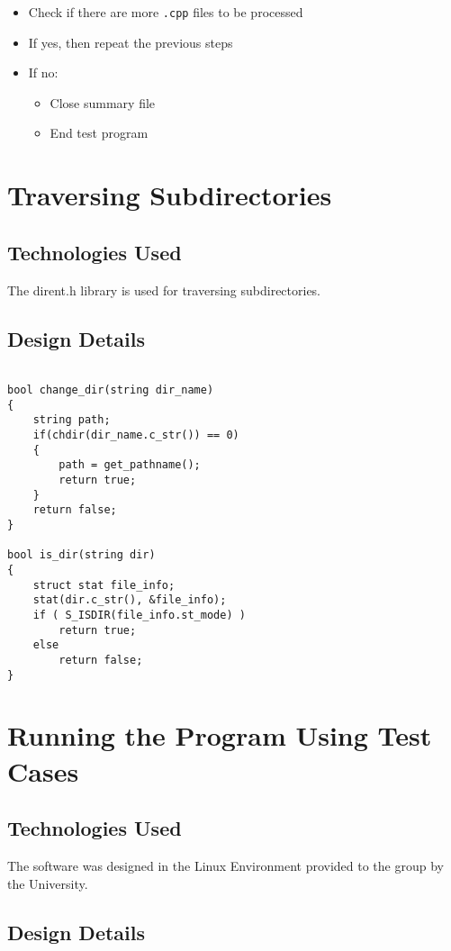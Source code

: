 \begin{itemize}
\item Check if there are more {\tt .cpp} files to be processed
  \item If yes, then repeat the previous steps
  \item If no:
	\begin{itemize}
 		\item Close summary file
 		\item End test program
	\end{itemize}
\end{itemize}


\section{Traversing Subdirectories }

\subsection{Technologies  Used}
The dirent.h library is used for traversing subdirectories.

\subsection{Design Details}

\begin{lstlisting}

bool change_dir(string dir_name)
{
    string path;
    if(chdir(dir_name.c_str()) == 0) 
    {
        path = get_pathname();
        return true;
    }
    return false;
}

bool is_dir(string dir)
{
    struct stat file_info;
    stat(dir.c_str(), &file_info);
    if ( S_ISDIR(file_info.st_mode) ) 
        return true;
    else 
        return false;
}
\end{lstlisting}

\section{Running the Program Using Test Cases }

\subsection{Technologies  Used}
The software was designed in the Linux Environment provided to the group by the University.



\subsection{Design Details}


